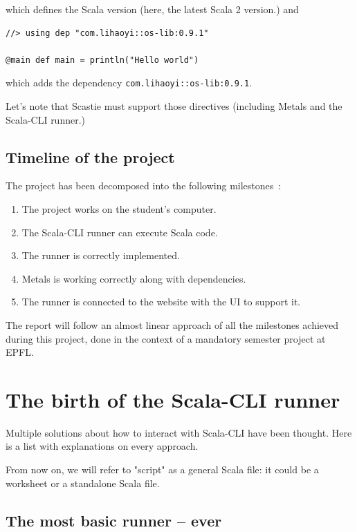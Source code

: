 \documentclass{article}
\begin{document}
which defines the Scala version (here, the latest Scala 2 version.) and

\begin{lstlisting}[style=sc]
//> using dep "com.lihaoyi::os-lib:0.9.1"

@main def main = println("Hello world")
\end{lstlisting}

which adds the dependency \lstinline{com.lihaoyi::os-lib:0.9.1}.

Let's note that Scastie must support those directives (including Metals and the Scala-CLI runner.)

\subsection{Timeline of the project}

The project has been decomposed into the following milestones~:

\begin{enumerate}
    \item The project works on the student's computer.
    \item The Scala-CLI runner can execute Scala code.
    \item The runner is correctly implemented.
    \item Metals is working correctly along with dependencies.
    \item The runner is connected to the website with the UI to support it.
\end{enumerate}

The report will follow an almost linear approach of all the milestones achieved during this project,
done in the context of a mandatory semester project at EPFL.

\section{The birth of the Scala-CLI runner}

Multiple solutions about how to interact with Scala-CLI have been thought. Here is a list with explanations on every approach.

From now on, we will refer to "script" as a general Scala file: it could be a worksheet or a standalone Scala file.

\subsection{The most basic runner -- ever}
\end{document}
